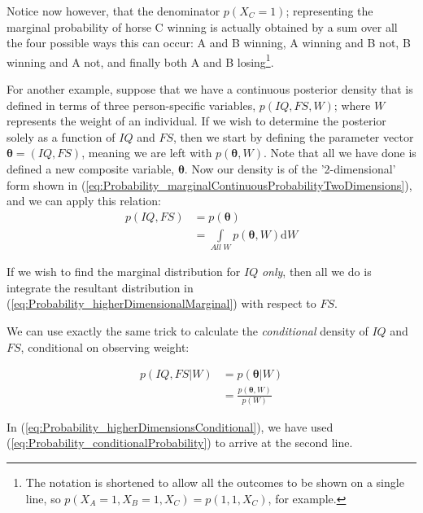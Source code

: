 \documentclass[11pt,fullpage]{book}
\begin{document}
Notice now however, that the denominator $p(X_C=1)$; representing the marginal probability of horse C winning is actually obtained by a sum over all the four possible ways this can occur: A and B winning, A winning and B not, B winning and A not, and finally both A and B losing\footnote{The notation is shortened to allow all the outcomes to be shown on a single line, so $p(X_A=1,X_B=1,X_C)=p(1,1,X_C)$, for example.}.

For another example, suppose that we have a continuous posterior density that is defined in terms of three person-specific variables, $p(IQ,FS,W)$; where $W$ represents the weight of an individual. If we wish to determine the posterior solely as a function of $IQ$ and $FS$, then we start by defining the parameter vector $\boldsymbol{\theta} = (IQ,FS)$, meaning we are left with $p(\boldsymbol{\theta},W)$. Note that all we have done is defined a new composite variable, $\boldsymbol{\theta}$. Now our density is of the '2-dimensional' form shown in (\ref{eq:Probability_marginalContinuousProbabilityTwoDimensions}), and we can apply this relation:\\

\begin{equation}\label{eq:Probability_higherDimensionalMarginal}
\begin{align}
p(IQ,FS) &= p(\boldsymbol{\theta})\\
&= \int\limits_{All\; W} p(\boldsymbol{\theta},W)\mathrm{d}W
\end{align}
\end{equation}

If we wish to find the marginal distribution for $IQ$ \textit{only}, then all we do is integrate the resultant distribution in (\ref{eq:Probability_higherDimensionalMarginal}) with respect to $FS$.

We can use exactly the same trick to calculate the \textit{conditional} density of $IQ$ and $FS$, conditional on observing weight:

\begin{equation}\label{eq:Probability_higherDimensionsConditional}
\begin{align}
p(IQ,FS|W) &= p(\boldsymbol{\theta}|W)\\
&= \frac{p(\boldsymbol{\theta},W)}{p(W)}
\end{align}
\end{equation}

In (\ref{eq:Probability_higherDimensionsConditional}), we have used (\ref{eq:Probability_conditionalProbability}) to arrive at the second line.
\end{document}
